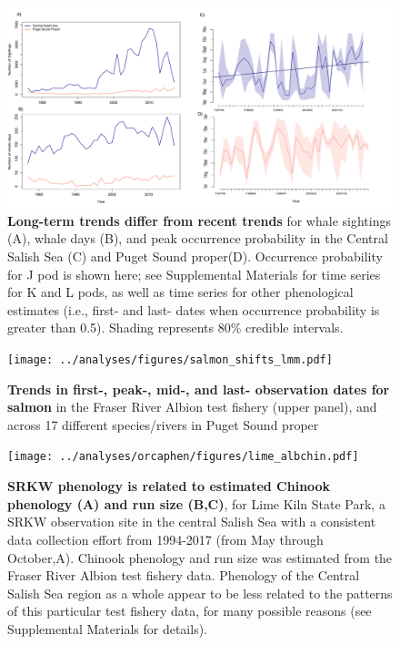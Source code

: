 \documentclass{article}
\begin{document}
\begin{figure}[p]
\includegraphics{../analyses/figures/OrcaPhenPlots/timeseries_1976_assumeSRKW2regs.pdf} 
\caption{\textbf{Long-term trends differ from recent trends} for whale sightings (A), whale days (B), and peak occurrence probability in the Central Salish Sea (C) and Puget Sound proper(D). Occurrence probability for J pod is shown here; see Supplemental Materials for time series for K and L pods, as well as time series for other phenological estimates (i.e., first- and last- dates when occurrence probability is greater than 0.5). Shading represents 80\% credible intervals.}
 \label{fig:timeseries}
 \end{figure}
 

\begin{figure}[p]
\texttt{[image: ../analyses/figures/salmon\_shifts\_lmm.pdf]} 
\caption{\textbf{Trends in first-, peak-, mid-, and last- observation dates for salmon} in the Fraser River Albion test fishery (upper panel), and across 17 different species/rivers in Puget Sound proper}
 \label{fig:shifts}
 \end{figure}

\begin{figure}[p]
\texttt{[image: ../analyses/orcaphen/figures/lime\_albchin.pdf]} 
\caption{\textbf{SRKW phenology is related to estimated Chinook phenology (A) and run size (B,C)}, for Lime Kiln State Park, a SRKW observation site in the central Salish Sea with a consistent data collection effort from 1994-2017 (from May through October,A). Chinook phenology and run size was estimated from the Fraser River Albion test fishery data. Phenology of the Central Salish Sea region as a whole appear to be less related to the patterns of this particular test fishery data, for many possible reasons (see Supplemental Materials for details).}
 \label{fig:shifts}
 \end{figure}
\end{document}
